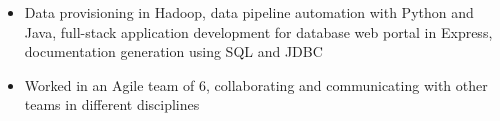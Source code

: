 \documentclass[10pt,a4paper,ragged2e,withhyper]{altacv}
\begin{document}


\begin{paracol}{2}

\tagline{}


\makecvheader


\begin{itemize}
    \item Data provisioning in Hadoop, data pipeline automation with Python and Java, full-stack application development for database web portal in Express, documentation generation using SQL and JDBC
    
    \item Worked in an Agile team of 6, collaborating and communicating with other teams in different disciplines
    
\end{itemize}


\end{paracol}
\end{document}
